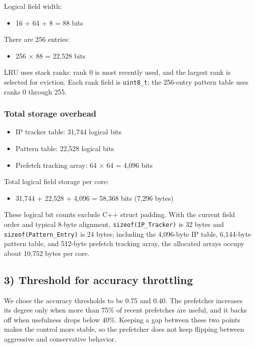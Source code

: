 \documentclass[10pt]{article}
\begin{document}
Logical field width:

\begin{itemize}
\item 16 + 64 + 8 = 88 bits
\end{itemize}

There are 256 entries:

\begin{itemize}
\item 256 $\times$ 88 = 22,528 bits
\end{itemize}

LRU uses stack ranks: rank 0 is most recently used, and the largest rank is selected for eviction. Each rank field is \texttt{uint8\_t}; the 256-entry pattern table uses ranks 0 through 255.

\subsubsection*{Total storage overhead}

\begin{itemize}
\item IP tracker table: 31,744 logical bits
\item Pattern table: 22,528 logical bits
\item Prefetch tracking array: 64 $\times$ 64 = 4,096 bits
\end{itemize}

Total logical field storage per core:

\begin{itemize}
\item 31,744 + 22,528 + 4,096 = 58,368 bits (7,296 bytes)
\end{itemize}

These logical bit counts exclude C++ struct padding. With the current field order and typical 8-byte alignment, \texttt{sizeof(IP\_Tracker)} is 32 bytes and \texttt{sizeof(Pattern\_Entry)} is 24 bytes; including the 4,096-byte IP table, 6,144-byte pattern table, and 512-byte prefetch tracking array, the allocated arrays occupy about 10,752 bytes per core.

\subsection*{3) Threshold for accuracy throttling}

We chose the accuracy thresholds to be 0.75 and 0.40. The prefetcher increases its degree only when more than 75\% of recent prefetches are useful, and it backs off when usefulness drops below 40\%. Keeping a gap between these two points makes the control more stable, so the prefetcher does not keep flipping between aggressive and conservative behavior.
\end{document}
